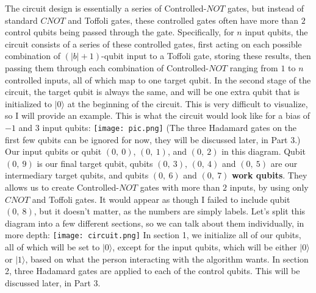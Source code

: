 \documentclass{article}
\begin{document}
\newline\newline
The circuit design is essentially a series of Controlled-$NOT$ gates, but instead of standard $CNOT$ and Toffoli gates, these controlled gates often have more than $2$ control qubits being passed through the gate. Specifically, for $n$ input qubits, the circuit consists of a series of these controlled gates, first acting on each possible combination of $(|b | + 1)$-qubit input to a Toffoli gate, storing these results, then passing them through each combination of Controlled-$NOT$ ranging from $1$ to $n$ controlled inputs, all of which map to one target qubit. In the second stage of the circuit, the target qubit is always the same, and will be one extra qubit that is initialized to $|0\rangle$ at the beginning of the circuit.
\newline\newline
This is very difficult to visualize, so I will provide an example. This is what the circuit would look like for a bias of $-1$ and $3$ input qubits:
\newline\newline
\texttt{[image: pic.png]}
\newline\newline
(The three Hadamard gates on the first few qubits can be ignored for now, they will be discussed later, in Part 3.)
\newline\newline
Our input qubits or qubit $(0, \ 0)$, $(0, \ 1)$, and $(0, \ 2)$ in this diagram. Qubit $(0, \ 9)$ is our final target qubit, qubits $(0, \ 3)$, $(0, \ 4)$ and $(0, \ 5)$ are our intermediary target qubits, and qubits $(0, \ 6)$ and $(0, \ 7)$ \textbf{work qubits}. They allows us to create Controlled-$NOT$ gates with more than $2$ inputs, by using only $CNOT$ and Toffoli gates. It would appear as though I failed to include qubit $(0, \ 8)$, but it doesn't matter, as the numbers are simply labels. Let’s split this diagram into a few different sections, so we can talk about them individually, in more depth:
\newline\newline
\texttt{[image: circuit.png]}
\newline\newline
In section 1, we initialize all of our qubits, all of which will be set to $|0\rangle$, except for the input qubits, which will be either $|0\rangle$ or $|1\rangle$, based on what the person interacting with the algorithm wants. In section 2, three Hadamard gates are applied to each of the control qubits. This will be discussed later, in Part 3.
\end{document}

